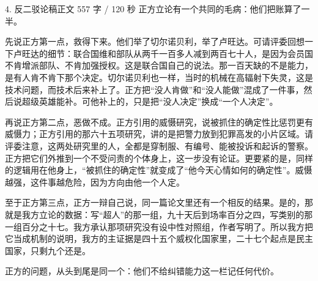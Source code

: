 \documentclass[script,con]{debate}
\begin{document}
\begin{speech}{4. 反二驳论稿}{正文 557 字 / 120 秒}
正方立论有一个共同的毛病：他们把账算了一半。

先说正方第一点，救得下来。他们举了切尔诺贝利，举了卢旺达。可请评委回想一下卢旺达的细节：联合国维和部队从两千一百多人减到两百七十人，是因为会员国不肯增派部队、不肯加强授权。这是联合国自己的说法。那一百天缺的不是能力，是有人肯不肯下那个决定。切尔诺贝利也一样，当时的机械在高辐射下失灵，这是技术问题，而技术后来补上了。正方把“没人肯做”和“没人能做”混成了一件事，然后说超级英雄能补。可他补上的，只是把“没人决定”换成“一个人决定”。

再说正方第二点，恶做不成。正方引用的威慑研究，说被抓住的确定性比惩罚更有威慑力；正方引用的那六十五项研究，讲的是把警力放到犯罪高发的小片区域。请评委注意，这两处研究里的人，全都是穿制服、有编号、能被投诉和起诉的警察。正方把它们外推到一个不受问责的个体身上，这一步没有论证。更要紧的是，同样的逻辑用在他身上，“被抓住的确定性”就变成了“他今天心情如何的确定性”。威慑越强，这件事越危险，因为方向由他一个人定。

至于正方第三点，正方一辩自己说，同一篇论文里还有一个相反的结果。是的，那就是我方立论的数据：写“超人”的那一组，九十天后到场率百分之四，写类别的那一组百分之十七。我方承认那项研究没有设中性对照组，作者写明了。所以我方把它当成机制的说明，我方的主证据是四十五个威权化国家里，二十七个起点是民主国家，只剩九个还是。

正方的问题，从头到尾是同一个：他们不给纠错能力这一栏记任何代价。

\begin{contingency}
\end{contingency}
\end{speech}
\end{document}
